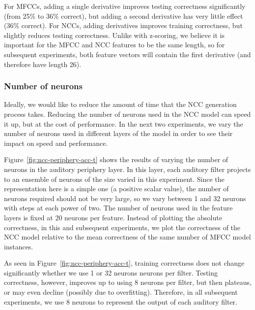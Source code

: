 For MFCCs, adding a single derivative
improves testing correctness
significantly
(from 25\% to 36\% correct),
but adding a second derivative
has very little effect
(36\% correct).
For NCCs, adding derivatives
improves training correctness,
but slightly reduces testing correctness.
Unlike with z-scoring,
we believe it is important
for the MFCC and NCC features to
be the same length,
so for subsequent experiments,
both feature vectors
will contain the first derivative
(and therefore have length 26).

\subsubsection{Number of neurons}

Ideally,
we would like to reduce the amount of time
that the NCC generation process takes.
Reducing the number of neurons
used in the NCC model
can speed it up,
but at the cost of performance.
In the next two experiments,
we vary the number of neurons used
in different layers of the model
in order to see their impact
on speed and performance.


Figure~\ref{fig:ncc-periphery-acc-t} shows the results of
varying the number of neurons
in the auditory periphery layer.
In this layer,
each auditory filter projects
to an ensemble of neurons
of the size varied in this experiment.
Since the representation here
is a simple one
(a positive scalar value),
the number of neurons required
should not be very large,
so we vary between
1 and 32 neurons with steps
at each power of two.
The number of neurons used
in the feature layers
is fixed at 20 neurons per feature.
Instead of plotting the absolute correctness,
in this and subsequent experiments,
we plot the correctness of the NCC model
relative to the mean correctness
of the same number
of MFCC model instances.

As seen in Figure~\ref{fig:ncc-periphery-acc-t},
training correctness
does not change significantly
whether we use
1 or 32 neurons neurons per filter.
Testing correctness,
however, improves up to
using 8 neurons per filter,
but then plateaus,
or may even decline
(possibly due to overfitting).
Therefore, in all
subsequent experiments,
we use 8 neurons to represent
the output of each auditory filter.

